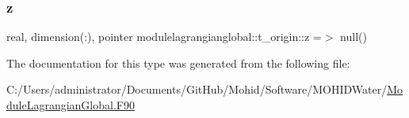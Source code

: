 \mbox{\label{structmodulelagrangianglobal_1_1t__origin_ad4118f00a251c01b0a28d74d5387508a}} 
\subsubsection{\texorpdfstring{z}{z}}
{\footnotesize\ttfamily real, dimension(\+:), pointer modulelagrangianglobal\+::t\+\_\+origin\+::z =$>$ null()\hspace{0.3cm}{\ttfamily [private]}}



The documentation for this type was generated from the following file\+:\begin{DoxyCompactItemize}
\item 
C\+:/\+Users/administrator/\+Documents/\+Git\+Hub/\+Mohid/\+Software/\+M\+O\+H\+I\+D\+Water/\mbox{\hyperlink{_module_lagrangian_global_8_f90}{Module\+Lagrangian\+Global.\+F90}}\end{DoxyCompactItemize}
